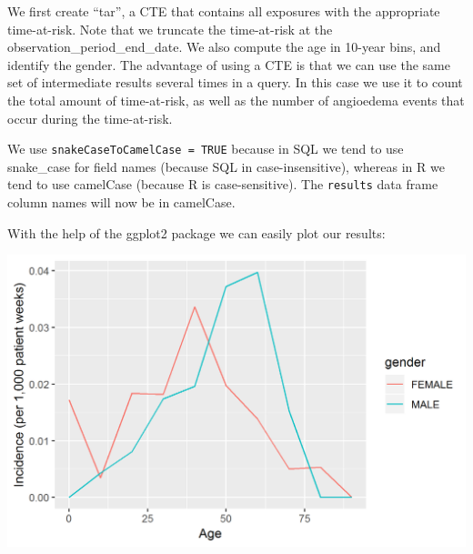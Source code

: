 \documentclass[11pt]{book}
\newenvironment{Shaded}{\begin{snugshade}}{\end{snugshade}}
\newcommand{\KeywordTok}[1]{\textcolor[rgb]{0.13,0.29,0.53}{\textbf{#1}}}
\newcommand{\DataTypeTok}[1]{\textcolor[rgb]{0.13,0.29,0.53}{#1}}
\newcommand{\DecValTok}[1]{\textcolor[rgb]{0.00,0.00,0.81}{#1}}
\newcommand{\StringTok}[1]{\textcolor[rgb]{0.31,0.60,0.02}{#1}}
\newcommand{\CommentTok}[1]{\textcolor[rgb]{0.56,0.35,0.01}{\textit{#1}}}
\newcommand{\OperatorTok}[1]{\textcolor[rgb]{0.81,0.36,0.00}{\textbf{#1}}}
\newcommand{\NormalTok}[1]{#1}
\begin{document}
We first create ``tar'', a CTE that contains all exposures with the
appropriate time-at-risk. Note that we truncate the time-at-risk at the
observation\_period\_end\_date. We also compute the age in 10-year bins,
and identify the gender. The advantage of using a CTE is that we can use
the same set of intermediate results several times in a query. In this
case we use it to count the total amount of time-at-risk, as well as the
number of angioedema events that occur during the time-at-risk.

We use \texttt{snakeCaseToCamelCase\ =\ TRUE} because in SQL we tend to
use snake\_case for field names (because SQL in case-insensitive),
whereas in R we tend to use camelCase (because R is case-sensitive). The
\texttt{results} data frame column names will now be in camelCase.

With the help of the ggplot2 package we can easily plot our results:

\begin{Shaded}
\end{Shaded}

\begin{center}\includegraphics[width=0.8\linewidth]{images/SqlAndR/ir} \end{center}
\end{document}
